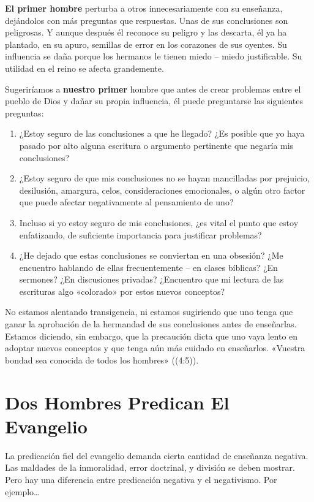 \documentclass[12pt, twoside, openright]{book}
\begin{document}
\textbf{El primer hombre} perturba a otros innecesariamente con su enseñanza, dejándolos con más preguntas que respuestas. Unas de sus conclusiones son peligrosas. Y aunque después él reconoce su peligro y las descarta, él ya ha plantado, en su apuro, semillas de error en los corazones de sus oyentes. Su influencia se daña porque los hermanos le tienen miedo – miedo justificable. Su utilidad en el reino se afecta grandemente. 

Sugeriríamos a \textbf{nuestro primer} hombre que antes de crear problemas entre el pueblo de Dios y dañar su propia influencia, él puede preguntarse las siguientes preguntas: 
\begin{enumerate}
\item ¿Estoy seguro de las conclusiones a que he llegado? ¿Es posible que yo haya pasado por alto alguna escritura o argumento pertinente que negaría mis conclusiones?
\item ¿Estoy seguro de que mis conclusiones no se hayan mancilladas por prejuicio, desilusión, amargura, celos, consideraciones emocionales, o algún otro factor que puede afectar negativamente al pensamiento de uno?
\item Incluso si yo estoy seguro de mis conclusiones, ¿es vital el punto que estoy enfatizando, de suficiente importancia para justificar problemas?
\item ¿He dejado que estas conclusiones se conviertan en una obsesión? ¿Me encuentro hablando de ellas frecuentemente – en clases bíblicas? ¿En sermones? ¿En discusiones privadas? ¿Encuentro que mi lectura de las escrituras algo «colorado» por estos nuevos conceptos?
\end{enumerate}
No estamos alentando transigencia, ni estamos sugiriendo que uno tenga que ganar la aprobación de la hermandad de sus conclusiones antes de enseñarlas. Estamos diciendo, sin embargo, que la precaución dicta que uno vaya lento en adoptar nuevos conceptos y que tenga aún más cuidado en enseñarlos. «Vuestra bondad sea conocida de todos los hombres» ((4:5)).

\section{Dos Hombres Predican El Evangelio}
La predicación fiel del evangelio demanda cierta cantidad de enseñanza negativa. Las maldades de la inmoralidad, error doctrinal, y división se deben mostrar. Pero hay una diferencia entre predicación negativa y el negativismo. Por ejemplo…
\end{document}

